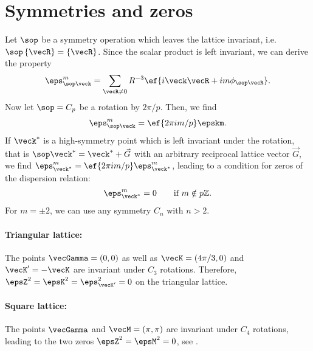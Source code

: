 \section{Symmetries and zeros}
Let $\sop$ be a symmetry operation which leaves the lattice invariant, i.e. $\sop \, \{ \vecR \} = \{ \vecR \}$.
Since the scalar product is left invariant,
we can derive the property
\begin{align}
    \eps_{\sop\veck}^m = \sum_{\vecR\ne 0} R^{-3} \ef{i\veck \vecR + i m \phi_{\sop\vecR}}.
\end{align}
Now let $\sop=C_p$ be a rotation by $2\pi/p$. Then, we find
\begin{align}
    \eps_{\sop \veck}^m = \ef{2\pi i m/p} \epskm.
\end{align}
If $\veck^*$ is a high-symmetry point which is left invariant under the rotation, that is
$\sop\veck^* = \veck^* + \vec{G}$ with an arbitrary reciprocal lattice vector $\vec{G}$, we find $\eps_{\veck^*}^m = \ef{2\pi i m/p} \eps_{\veck^*}^m$, leading to a condition for zeros of the dispersion relation:
\begin{align}
    \eps^m_{\veck^*} = 0\qquad\text{if } m \notin p\mathbb{Z}.
\end{align}
For $m=\pm 2$, we can use any symmetry $C_n$ with $n>2$.

\paragraph{Triangular lattice:} The points $\vecGamma=(0,0)$ as well as
$\vecK=(4\pi/3,0)$ and $\vecK'=- \vecK$ are invariant under $C_3$ rotations. Therefore,
$\epsZ^2=\epsK^2=\eps^2_{\vecK'}=0$ on the triangular lattice.

\paragraph{Square lattice:} The points $\vecGamma$ and $\vecM=(\pi,\pi)$ are
invariant under $C_4$ rotations, leading to the two zeros $\epsZ^2=\epsM^2=0$, see .


